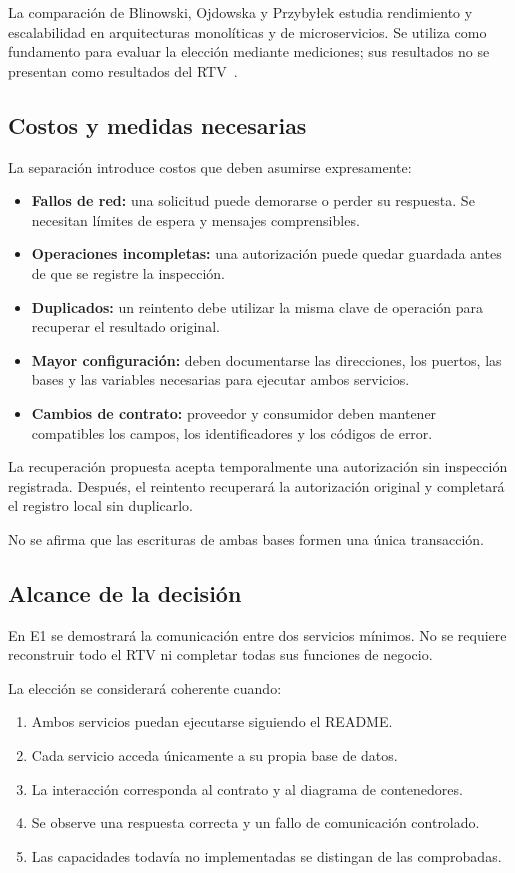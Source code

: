 \documentclass[11pt,a4paper]{article}
\begin{document}
La comparación de Blinowski, Ojdowska y Przybyłek estudia rendimiento y escalabilidad en arquitecturas monolíticas y de microservicios. Se utiliza como fundamento para evaluar la elección mediante mediciones; sus resultados no se presentan como resultados del RTV~\cite{blinowski2022monolithic}.

\subsection{Costos y medidas necesarias}

La separación introduce costos que deben asumirse expresamente:

\begin{itemize}[nosep]
  \item \textbf{Fallos de red:} una solicitud puede demorarse o perder su respuesta. Se necesitan límites de espera y mensajes comprensibles.
  \item \textbf{Operaciones incompletas:} una autorización puede quedar guardada antes de que se registre la inspección.
  \item \textbf{Duplicados:} un reintento debe utilizar la misma clave de operación para recuperar el resultado original.
  \item \textbf{Mayor configuración:} deben documentarse las direcciones, los puertos, las bases y las variables necesarias para ejecutar ambos servicios.
  \item \textbf{Cambios de contrato:} proveedor y consumidor deben mantener compatibles los campos, los identificadores y los códigos de error.
\end{itemize}

La recuperación propuesta acepta temporalmente una autorización sin inspección registrada. Después, el reintento recuperará la autorización original y completará el registro local sin duplicarlo.

No se afirma que las escrituras de ambas bases formen una única transacción.

\subsection{Alcance de la decisión}

En E1 se demostrará la comunicación entre dos servicios mínimos. No se requiere reconstruir todo el RTV ni completar todas sus funciones de negocio.

La elección se considerará coherente cuando:

\begin{enumerate}[nosep]
  \item Ambos servicios puedan ejecutarse siguiendo el README.
  \item Cada servicio acceda únicamente a su propia base de datos.
  \item La interacción corresponda al contrato y al diagrama de contenedores.
  \item Se observe una respuesta correcta y un fallo de comunicación controlado.
  \item Las capacidades todavía no implementadas se distingan de las comprobadas.
\end{enumerate}
\end{document}
